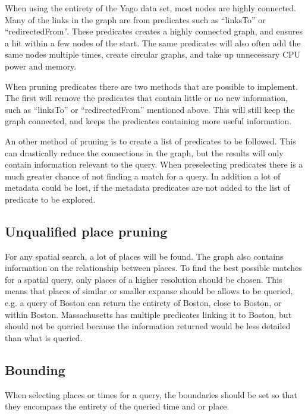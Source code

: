 When using the entirety of the Yago data set, most nodes are highly connected. Many of the links in the graph are from predicates such as ``linksTo'' or ``redirectedFrom''. These predicates creates a highly connected graph, and ensures a hit within a few nodes of the start. The same predicates will also often add the same nodes multiple times, create circular graphs, and take up unnecessary CPU power and memory.

When pruning predicates there are two methods that are possible to implement. The first will remove the predicates that contain little or no new information, such as ``linksTo'' or ``redirectedFrom'' mentioned above. This will still keep the graph connected, and keeps the predicates containing more useful information.

An other method of pruning is to create a list of predicates to be followed. This can drastically reduce the connections in the graph, but the results will only contain information relevant to the query. When preselecting predicates there is a much greater chance of not finding a match for a query. In addition a lot of metadata could be lost, if the metadata predicates are not added to the list of predicate to be explored.

\subsection{Unqualified place pruning}
For any spatial search, a lot of places will be found. The graph also contains information on the relationship between places. To find the best possible matches for a spatial query, only places of a higher resolution should be chosen. This means that places of similar or smaller expanse should be allows to be queried, e.g. a query of Boston can return the entirety of Boston, close to Boston, or within Boston. Massachusetts has multiple predicates linking it to Boston, but should not be queried because the information returned would be less detailed than what is queried. 

\subsection{Bounding}
When selecting places or times for a query, the boundaries should be set so that they encompass the entirety of the queried time and or place.

\glsresetall

